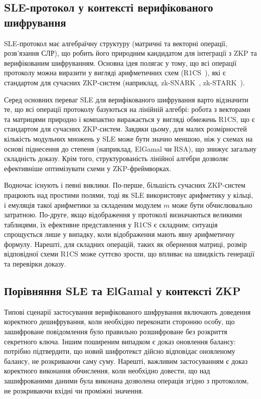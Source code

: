 \subsection{SLE-протокол у контексті верифікованого шифрування}\label{subsec:sle-----}

SLE-протокол має алгебраїчну структуру (матричні та векторні операції, розв'язання СЛР), що робить його природним кандидатом для інтеграції з ZKP та верифікованим шифруванням.
Основна ідея полягає у тому, що всі операції протоколу можна виразити у вигляді арифметичних схем (R1CS~\cite{pinocchio}), які є стандартом для сучасних ZKP-систем (наприклад, zk-SNARK~\cite{14, 15}, zk-STARK~\cite{stark}).

Серед основних переваг SLE для верифікованого шифрування варто відзначити те, що всі операції протоколу базуються на лінійній алгебрі: робота з векторами та матрицями природно і компактно виражається у вигляді обмежень R1CS, що є стандартом для сучасних ZKP-систем.
Завдяки цьому, для малих розмірностей кількість модульних множень у SLE може бути значно меншою, ніж у схемах на основі піднесення до степеня (наприклад, ElGamal чи RSA), що знижує загальну складність доказу.
Крім того, структурованість лінійної алгебри дозволяє ефективніше оптимізувати схеми у ZKP-фреймворках.

Водночас існують і певні виклики.
По-перше, більшість сучасних ZKP-систем працюють над простими полями, тоді як SLE використовує арифметику у кільці, і емуляція такої арифметики за складеним модулем $m$ може бути обчислювально затратною.
По-друге, якщо відображення у протоколі визначаються великими таблицями, їх ефективне представлення у R1CS є складним; ситуація спрощується лише у випадку, коли відображення мають явну арифметичну формулу.
Нарешті, для складних операцій, таких як обернення матриці, розмір відповідної схеми R1CS може суттєво зрости, що впливає на швидкість генерації та перевірки доказу.

\subsection{Порівняння SLE та ElGamal у контексті ZKP}\label{subsec:-sle--elgamal---zkp}

Типові сценарії застосування верифікованого шифрування включають доведення коректного дешифрування, коли необхідно переконати сторонню особу, що зашифроване повідомлення було правильно розшифроване без розкриття секретного ключа.
Іншим поширеним випадком є доказ оновлення балансу: потрібно підтвердити, що новий шифротекст дійсно відповідає оновленому балансу, не розкриваючи саму суму.
Нарешті, важливим застосуванням є доказ коректного виконання обчислення, коли необхідно довести, що над зашифрованими даними була виконана дозволена операція згідно з протоколом, не розкриваючи вхідні чи проміжні значення.

